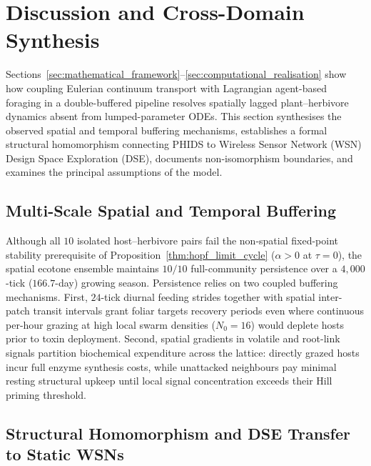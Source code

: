 


\section{Discussion and Cross-Domain Synthesis}
\label{sec:discussion}

Sections~\ref{sec:mathematical_framework}--\ref{sec:computational_realisation} show how coupling Eulerian continuum transport with Lagrangian agent-based foraging in a double-buffered pipeline resolves spatially lagged plant--herbivore dynamics absent from lumped-parameter ODEs. This section synthesises the observed spatial and temporal buffering mechanisms, establishes a formal structural homomorphism connecting PHIDS to Wireless Sensor Network (WSN) Design Space Exploration (DSE), documents non-isomorphism boundaries, and examines the principal assumptions of the model.

\subsection{Multi-Scale Spatial and Temporal Buffering}
\label{subsec:spatial_temporal_buffering}

Although all $10$ isolated host--herbivore pairs fail the non-spatial fixed-point stability prerequisite of Proposition~\ref{thm:hopf_limit_cycle} ($\alpha > 0$ at $\tau = 0$), the spatial ecotone ensemble maintains $10/10$ full-community persistence over a $4{,}000$-tick ($166.7$-day) growing season. Persistence relies on two coupled buffering mechanisms. First, $24$-tick diurnal feeding strides together with spatial inter-patch transit intervals grant foliar targets recovery periods even where continuous per-hour grazing at high local swarm densities ($N_0 = 16$) would deplete hosts prior to toxin deployment. Second, spatial gradients in volatile and root-link signals partition biochemical expenditure across the lattice: directly grazed hosts incur full enzyme synthesis costs, while unattacked neighbours pay minimal resting structural upkeep until local signal concentration exceeds their Hill priming threshold.

\subsection{Structural Homomorphism and DSE Transfer to Static WSNs}
\label{sec:wsn_isomorphism}
\label{subsec:wsn_actionable_protocols}

